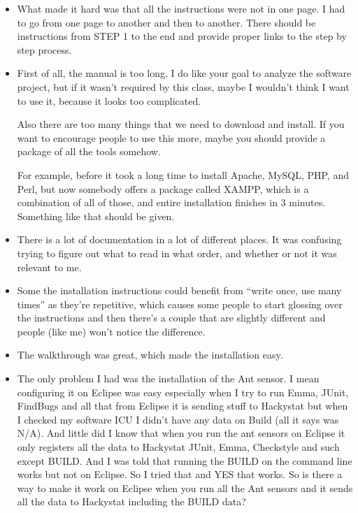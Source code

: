 \documentclass[11pt]{article}
\begin{document}
\begin{itemize}
\item What made it hard was that all the instructions were not in one page.  I had to go from one page to another and then to another.  There should be instructions from STEP 1 to the end and provide proper links to the step by step process.

\item First of all, the manual is too long. I do like your goal to analyze the software project, but if it wasn't required by this class, maybe I wouldn't think I want to use it, because it looks too complicated. 

Also there are too many things that we need to download and install. If you want to encourage people to use this more, maybe you should provide a package of all the tools somehow. 

For example, before it took a long time to install Apache, MySQL, PHP, and Perl, but now somebody offers a package called XAMPP, which is a combination of all of those, and entire installation finishes in 3 minutes. Something like that should be given. 

\item There is a lot of documentation in a lot of different places.  It was confusing trying to figure out what to read in what order, and whether or not it was relevant to me.

\item Some the installation instructions could benefit from ``write once, use many times'' as they're repetitive, which causes some people to start glossing over the instructions and then there's a couple that are slightly different and people (like me) won't notice the difference.

\item The walkthrough was great, which made the installation easy.

\item The only problem I had was the installation of the Ant sensor. I mean configuring it on Eclipse was easy especially when I try to run Emma, JUnit, FindBugs and all that from Eclipse it is sending stuff to Hackystat but when I checked my software ICU I didn't have any data on Build (all it says was N/A). And little did I know that when you run the ant sensors on Eclipse it only registers all the data to Hackystat JUnit, Emma, Checkstyle and such except BUILD. And I was told  that running the BUILD on the command line works but not on Eclipse. So I tried that and YES that works. So is there a way to make it work on Eclipse when you run all the Ant sensors and it sends all the data to Hackystat including the BUILD data?


\end{itemize}
\end{document}
